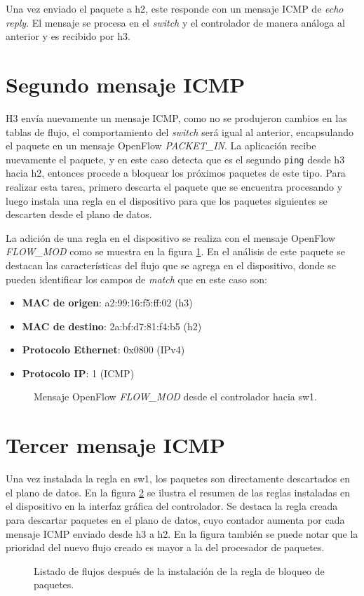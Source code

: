 Una vez enviado el paquete a h2, este responde con un mensaje ICMP de \textit{echo reply}. El mensaje se procesa en el \textit{switch} y el controlador de manera análoga al anterior y es recibido por h3.

\section{Segundo mensaje ICMP}
H3 envía nuevamente un mensaje ICMP, como no se produjeron cambios en las tablas de flujo, el comportamiento del \textit{switch} será igual al anterior, encapsulando el paquete en un mensaje  OpenFlow \textit{PACKET\_IN}. La aplicación recibe nuevamente el paquete, y en este caso detecta que es el segundo \texttt{ping} desde h3 hacia h2, entonces procede a bloquear los próximos paquetes de este tipo. Para realizar esta tarea, primero descarta el paquete que se encuentra procesando y luego instala una regla en el dispositivo para que los paquetes siguientes se descarten desde el plano de datos. 

La adición de una regla en el dispositivo se realiza con el mensaje OpenFlow \textit{FLOW\_MOD} como se muestra en la figura \ref{fig:flowmod}. En el análisis de este paquete se destacan las características del flujo que se agrega en el dispositivo, donde se pueden identificar los campos de \textit{match} que en este caso son:
\begin{itemize}
	\item \textbf{MAC de origen}: a2:99:16:f5:ff:02 (h3)
	\item \textbf{MAC de destino}: 2a:bf:d7:81:f4:b5 (h2)
	\item \textbf{Protocolo Ethernet}: 0x0800 (IPv4)
	\item \textbf{Protocolo IP}: 1 (ICMP)
\end{itemize}
\begin{figure}[th] 
	\centering 
	\caption[Mensaje OpenFlow \textit{FLOW\_MOD} desde el controlador hacia sw1] {Mensaje OpenFlow \textit{FLOW\_MOD} desde el controlador hacia sw1.}
	\label{fig:flowmod}
\end{figure}
\section{Tercer mensaje ICMP}
Una vez instalada la regla en sw1, los paquetes son directamente descartados en el plano de datos. En la figura \ref{fig:flowfinal} se ilustra el resumen de las reglas instaladas en el dispositivo en la interfaz gráfica del controlador. Se destaca la regla creada para descartar paquetes en el plano de datos, cuyo contador aumenta por cada mensaje ICMP enviado desde h3 a h2. En la figura también se puede notar que la prioridad del nuevo flujo creado es mayor a la del procesador de paquetes.
\begin{figure}[th] 
	\centering 
	\caption[Listado de flujos después de la instalación de la regla de bloqueo de paquetes] {Listado de flujos después de la instalación de la regla de bloqueo de paquetes.}
	\label{fig:flowfinal}
\end{figure}

